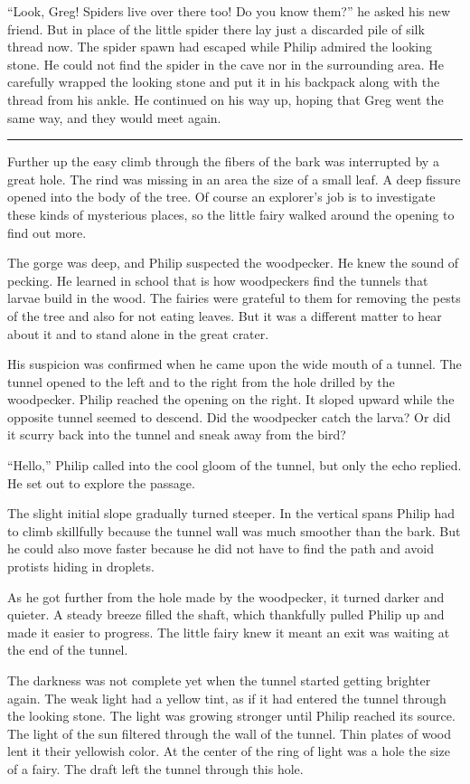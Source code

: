 \documentclass[10pt, draft]{memoir}
\renewcommand{\pfbreakdisplay}{\bigskip \ding{166} \bigskip}
\newcommand{\secbreak}{\fancybreak{\pfbreakdisplay}}
\begin{document}
``Look, Greg! Spiders live over there too! Do you know them?'' he asked his new
friend. But in place of the little spider there lay just a discarded pile of
silk thread now. The spider spawn had escaped while Philip admired the looking
stone. He could not find the spider in the cave nor in the surrounding area. He
carefully wrapped the looking stone and put it in his backpack along with the
thread from his ankle. He continued on his way up, hoping that Greg went the
same way, and they would meet again.

\secbreak

Further up the easy climb through the fibers of the bark was interrupted by a
great hole. The rind was missing in an area the size of a small leaf. A deep
fissure opened into the body of the tree. Of course an explorer's job is to
investigate these kinds of mysterious places, so the little fairy walked around
the opening to find out more.

The gorge was deep, and Philip suspected the woodpecker. He knew the sound of
pecking. He learned in school that is how woodpeckers find the tunnels that
larvae build in the wood. The fairies were grateful to them for removing the
pests of the tree and also for not eating leaves. But it was a different matter
to hear about it and to stand alone in the great crater.

His suspicion was confirmed when he came upon the wide mouth of a tunnel. The
tunnel opened to the left and to the right from the hole drilled by the
woodpecker. Philip reached the opening on the right. It sloped upward while the
opposite tunnel seemed to descend. Did the woodpecker catch the larva? Or did
it scurry back into the tunnel and sneak away from the bird?

``Hello,'' Philip called into the cool gloom of the tunnel, but only the echo
replied. He set out to explore the passage.

The slight initial slope gradually turned steeper. In the vertical spans Philip
had to climb skillfully because the tunnel wall was much smoother than the
bark. But he could also move faster because he did not have to find the path
and avoid protists hiding in droplets.

As he got further from the hole made by the woodpecker, it turned darker and
quieter. A steady breeze filled the shaft, which thankfully pulled Philip up
and made it easier to progress. The little fairy knew it meant an exit was
waiting at the end of the tunnel.

The darkness was not complete yet when the tunnel started getting brighter
again. The weak light had a yellow tint, as if it had entered the tunnel
through the looking stone. The light was growing stronger until Philip reached
its source. The light of the sun filtered through the wall of the tunnel. Thin
plates of wood lent it their yellowish color. At the center of the ring of
light was a hole the size of a fairy. The draft left the tunnel through this
hole.
\end{document}
